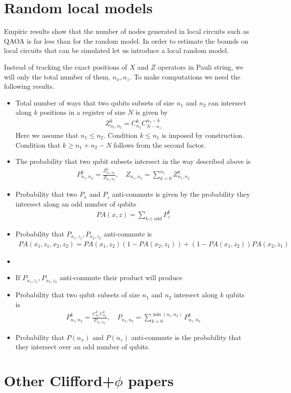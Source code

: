 \documentclass[12 pt]{article}
\begin{document}
\section{Random local models}
Empiric results show that the number of nodes generated in local circuits such as QAOA is far less than for the random model. In order to estimate the bounds on local circuits that can be simulated let us introduce a local random model.

Instead of tracking the exact positions of $X$ and $Z$ operators in Pauli string, we will only the total number of them, $n_x, n_z$.
To make computations we need the following results.
\begin{itemize}
	\item Total number of ways that two qubits subsets of size $n_1$ and $n_2$ can intersect along $k$ positions in a register of size $N$ is given by
	\begin{align}
		Z_{n_1,n_2}^k=C_{n_1}^{k}C_{N-n_1}^{n_2-k}
	\end{align}
	Here we assume that $n_1\le n_2$. Condition $k\le n_1$ is imposed by construction. Condition that $k\ge n_1+n_2-N$ follows from the second factor.
	\item The probability that two qubit subsets intersect in the way described above is
	\begin{align}
		P_{n_1,n_2}^k=\frac{Z_{n_1,n_2}^k}{Z_{n_1,n_2}},\quad Z_{n_1,n_2}=\sum_{k=0}^{n_1}Z_{n_1,n_2}^k
	\end{align}
	
	\item Probability that two $P_{x}$ and $P_{z}$ anti-commute is given by the probability they intersect along an odd number of qubits
	\begin{align}
		PA(x,z)=\sum_{k\in\text{odd}}P_{z}^k
	\end{align}
	\item Probability that $P_{x_1,z_1}, P_{x_2,z_2}$ anti-commute is 
	\begin{align}
		PA(x_1,z_1,x_2,z_2)=PA(x_1,z_2)(1-PA(x_2,z_1))+(1-PA(x_1,z_2))PA(x_2,z_1)
	\end{align}
	\item 
	\item If $P_{x_1,z_1}, P_{x_2,z_2}$ anti-commute their product will produce 
	
	\item Probability that two qubit subsets of size $n_1$ and $n_2$ intersect along $k$ qubits is
	\begin{align}
		P_{n_1,n_2}^k=\frac{C_{n_1}^kC_{n_2}^k}{P_{n_1,n_2}},\quad P_{n_1,n_2}=\sum_{k=0}^{\min(n_1,n_2)}P_{n_1,n_2}^k
	\end{align}
	\item Probability that $P(n_x)$ and $P(n_z)$ anti-commute is the probability that they intersect over an odd number of qubits. 
\end{itemize}

\section{Other Clifford+$\phi$ papers}
\end{document}
